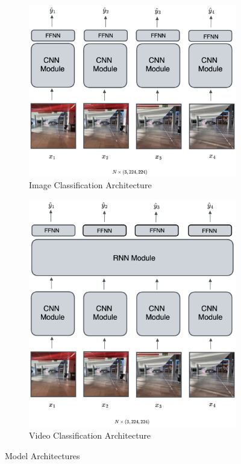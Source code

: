 \documentclass[a4paper]{article}
\begin{document}
  \begin{figure}[ht]
    \centering
    \begin{subfigure}[b]{0.42\linewidth}
      \centering
      \includegraphics[width=\linewidth]{figures/cnn-architecture.png}
      \caption{Image Classification Architecture}
      \label{fig:cnn-architecture}
    \end{subfigure}
    \hfill
    \begin{subfigure}[b]{0.42\linewidth}
      \centering
      \includegraphics[width=\linewidth]{figures/rnn-architecture.png}
      \caption{Video Classification Architecture}
      \label{fig:rnn-architecture}
    \end{subfigure}
    \caption{Model Architectures}
    \label{fig:model-architectures}
  \end{figure}
\end{document}
